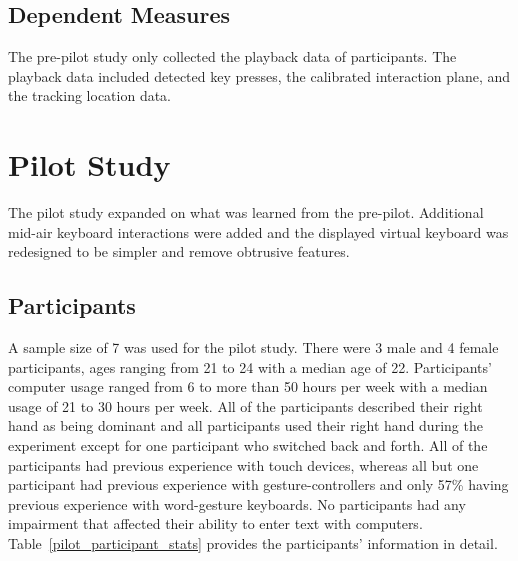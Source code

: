 \begin{table}[h]
	\centering
	\caption[Pre-pilot Study Schedule of Assessments]{\centering Schedule of Assessments for a single study visit (in minutes).}
	\label{pre_schedule_of_assessments}
\end{table}

\subsection{Dependent Measures}
The pre-pilot study only collected the playback data of participants. The playback data included detected key presses, the calibrated interaction plane, and the tracking location data.

\section{Pilot Study} \label{pilot}
The pilot study expanded on what was learned from the pre-pilot. Additional mid-air keyboard interactions were added and the displayed virtual keyboard was redesigned to be simpler and remove obtrusive features.

\subsection{Participants} \label{pilot_participants}
A sample size of 7 was used for the pilot study. There were 3 male and 4 female participants, ages ranging from 21 to 24 with a median age of 22. Participants' computer usage ranged from 6 to more than 50 hours per week with a median usage of 21 to 30 hours per week. All of the participants described their right hand as being dominant and all participants used their right hand during the experiment except for one participant who switched back and forth. All of the participants had previous experience with touch devices, whereas all but one participant had previous experience with gesture-controllers and only 57\% having previous experience with word-gesture keyboards. No participants had any impairment that affected their ability to enter text with computers. Table~\ref{pilot_participant_stats} provides the participants' information in detail.

